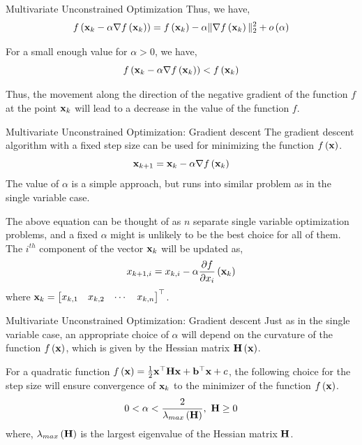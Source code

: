 \documentclass[aspectratio=169]{beamer}
\def\mf{\ensuremath\mathbf}
\def\lp{\ensuremath\left(}
\def\rp{\ensuremath\right)}
\def\bmx{\ensuremath\begin{bmatrix*}[r]}
\def\emx{\ensuremath\end{bmatrix*}}
\newcommand{\ct}[1]{\lp #1\rp}
\begin{document}
\begin{frame} {Multivariate Unconstrained Optimization}
  Thus, we have,
  \[ f\ct{\mf{x}_k - \alpha \nabla f\ct{\mf{x}_k}} =  f\ct{\mf{x}_k} - \alpha \Vert \nabla f\ct{\mf{x}_k} \Vert_2^2 + o\ct{\alpha} \]

  For a small enough value for $\alpha > 0$, we have,
  \[ f\ct{\mf{x}_k - \alpha \nabla f\ct{\mf{x}_k}} < f\ct{\mf{x}_k} \]

  Thus, the movement along the direction of the negative gradient of the function $f$ at the point $\mf{x}_k$ will lead to a decrease in the value of the function $f$.
\end{frame}


\begin{frame} {Multivariate Unconstrained Optimization: Gradient descent}
  The gradient descent algorithm with a fixed step size can be used for minimizing the function $f\ct{\mf{x}}$.
  \[ \mf{x}_{k+1} = \mf{x}_{k} - \alpha \nabla f\ct{\mf{x}_k} \]
  The value of $\alpha$ is a simple approach, but runs into similar problem as in the single variable case. 
  \vspace{0.2cm}
  
  The above equation can be thought of as $n$ separate single variable optimization problems, and a fixed $\alpha$ might is unlikely to be the best choice for all of them. The $i^{th}$ component of the vector $\mf{x}_k$ will be updated as,
  \[ x_{{k+1}, i} = x_{{k}, i} - \alpha \frac{\partial f}{\partial x_i}\ct{\mf{x}_k} \]
  where $\mf{x}_k = \bmx x_{k, 1} & x_{k, 2} & \cdots & x_{k, n}\emx^\top$.
\end{frame}


\begin{frame} {Multivariate Unconstrained Optimization: Gradient descent}
  Just as in the single variable case, an appropriate choice of $\alpha$ will depend on the curvature of the function $f\ct{\mf{x}}$, which is given by the Hessian matrix $\mf{H}\ct{\mf{x}}$.
  \vspace{0.2cm}

  For a quadratic function $f\ct{\mf{x}} = \frac{1}{2}\mf{x}^\top \mf{H} \mf{x} + \mf{b}^\top \mf{x} + c$, the following choice for the step size will ensure convergence of $\mf{x}_k$ to the minimizer of the function $f\ct{\mf{x}}$.
  \[ 0 < \alpha < \frac{2}{\lambda_{max}\ct{\mf{H}}}, \,\, \mf{H} \geq 0 \]
  where, $\lambda_{max}\ct{\mf{H}}$ is the largest eigenvalue of the Hessian matrix $\mf{H}$.
\end{frame}
\end{document}
